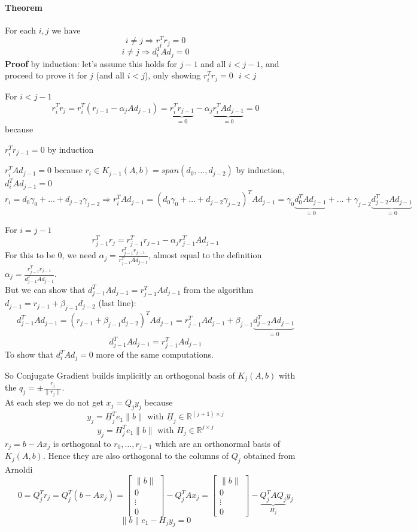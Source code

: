 \documentclass[10pt]{report}
\begin{document}
\paragraph{Theorem} For each $i,j$ we have
$$i\neq j \Rightarrow r_i^Tr_j=0$$
$$i\neq j \Rightarrow d_i^TAd_j=0$$
\textbf{Proof} by induction: let's assume this holds for $j-1$ and all $i<j-1$, and proceed to prove it for $j$ (and all $i<j$), only showing $r_i^Tr_j = 0\:\:\:i<j$
\begin{list}{}{}
	\item For $i<j-1$ $$r_i^Tr_j = r_i^T(r_{j-1}-\alpha_jAd_{j-1})=\underset{=0}{\underbrace{r_i^Tr_{j-1}}}-\alpha_j\underset{=0}{\underbrace{r_i^TAd_{j-1}}} = 0$$ because
	\begin{list}{}{}
		\item $r_i^Tr_{j-1} = 0$ by induction
		\item $r_i^TAd_{j-1} = 0$ because $r_i\in K_{j-1}(A,b) = span(d_0,\ldots,d_{j-2})$ by induction, $d_i^TAd_{j-1}=0$\\
		$r_i = d_0\gamma_0 + \ldots + d_{j-2}\gamma_{j-2} \Rightarrow r_i^TAd_{j-1} = ( d_0\gamma_0 + \ldots + d_{j-2}\gamma_{j-2})^TAd_{j-1} = \gamma_0\underset{=0}{\underbrace{d_0^TAd_{j-1}}}+\ldots + \gamma_{j-2}\underset{=0}{\underbrace{d_{j-2}^TAd_{j-1}}}$
	\end{list}
	\item For $i=j-1$ $$r_{j-1}^Tr_j = r_{j-1}^Tr_{j-1} -\alpha_jr_{j-1}^TAd_{j-1}$$
	For this to be 0, we need $\alpha_j = \frac{r_{j-1}^Tr_{j-1}}{r_{j-1}^TAd_{j-1}}$, almost equal to the definition $\alpha_j = \frac{r_{j-1}^Tr_{j-1}}{d_{j-1}^TAd_{j-1}}$.\\
	But we can show that $d_{j-1}^TAd_{j-1} = r_{j-1}^TAd_{j-1}$ from the algorithm $d_{j-1} = r_{j-1}+\beta_{j-1}d_{j-2}$ (last line):
	$$d_{j-1}^TAd_{j-1} =(r_{j-1}+\beta_{j-1}d_{j-2})^TAd_{j-1} = r_{j-1}^TAd_{j-1} + \beta_{j-1}\underset{=0}{\underbrace{d_{j-2}^TAd_{j-1}}}$$
	$$d_{j-1}^TAd_{j-1}=r_{j-1}^TAd_{j-1}$$
	To show that $d_i^TAd_j=0$ more of the same computations.
\end{list}
So Conjugate Gradient builds implicitly an orthogonal basis of $K_j(A,b)$ with the $q_j=\pm\frac{r_j}{\|r_j\|}$.\\
At each step we do not get $x_j=Q_jy_j$ because
$$y_j=\underline{H}_j^T e_1\|b\|\text{ with } \underline{H}_j\in\mathbb{R}^{(j+1)\times j}$$
$$y_j=H_j^T e_1\|b\|\text{ with } H_j\in\mathbb{R}^{j\times j}$$
$r_j=b-Ax_j$ is orthogonal to $r_0,\ldots,r_{j-1}$ which are an orthonormal basis of $K_j(A,b)$. Hence they are also orthogonal to the columns of $Q_j$ obtained from Arnoldi
$$0=Q_j^Tr_j=Q_j^T(b-Ax_j)=\left[\begin{array}{c}\|b\|\\0\\\vdots\\0\end{array}\right]-Q_j^TAx_j = \left[\begin{array}{c}\|b\|\\0\\\vdots\\0\end{array}\right] - \underset{H_j}{\underbrace{Q_j^TAQ_j}}y_j$$
$$\|b\|e_1-H_jy_j = 0$$
\end{document}
